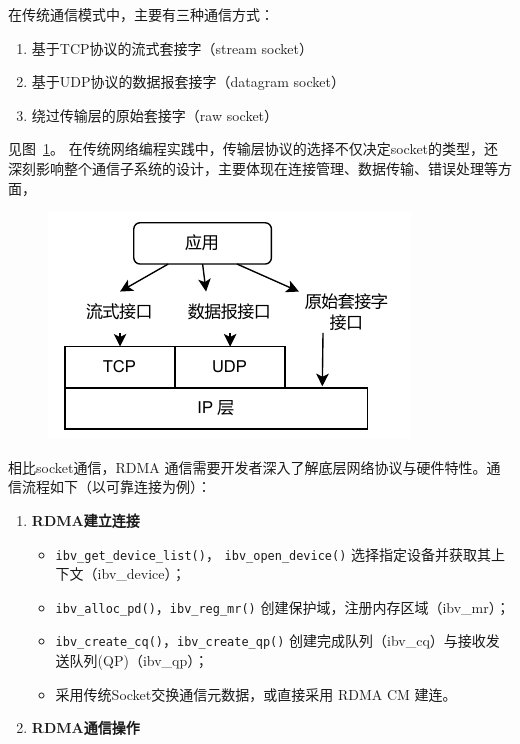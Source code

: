 {    在传统通信模式中，主要有三种通信方式：
    \begin{enumerate}
        \item 基于TCP协议的流式套接字（stream socket）
        \item 基于UDP协议的数据报套接字（datagram socket）
        \item 绕过传输层的原始套接字（raw socket）
    \end{enumerate}

    见图~\ref{fig:Socket-Type}。
    在传统网络编程实践中，传输层协议的选择不仅决定socket的类型，还深刻影响整个通信子系统的设计，主要体现在连接管理、数据传输、错误处理等方面，
    \begin{figure}[!htbp]
        \centering
        \includegraphics[width=0.35\linewidth]{Img/三种socket类型.drawio.pdf}
        \label{fig:Socket-Type}
    \end{figure}

    相比socket通信，RDMA 通信需要开发者深入了解底层网络协议与硬件特性。通信流程如下（以可靠连接为例）：
    \begin{enumerate}[label=\textbf{步骤 \arabic*.}, leftmargin=0.5cm, align=left]
        \item \textbf{RDMA建立连接}
              \begin{itemize}
                  \item \texttt{ibv\_get\_device\_list()}， \texttt{ibv\_open\_device()}
                        选择指定设备并获取其上下文（ibv\_device）；
                  \item \texttt{ibv\_alloc\_pd()}，\texttt{ibv\_reg\_mr()} 创建保护域，注册内存区域（ibv\_mr）；
                  \item \texttt{ibv\_create\_cq()}，\texttt{ibv\_create\_qp()} 创建完成队列（ibv\_cq）与接收发送队列(QP)（ibv\_qp）；
                  \item 采用传统Socket交换通信元数据，或直接采用 RDMA CM 建连。
              \end{itemize}

        \item \textbf{RDMA通信操作}


\end{enumerate}}
